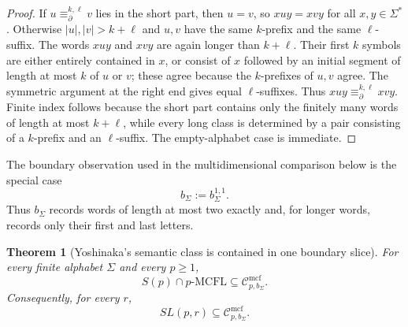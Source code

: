 \documentclass[11pt,a4paper]{article}
\numberwithin{equation}{section}
\theoremstyle{plain}
\newtheorem{theorem}{Theorem}[section]
\theoremstyle{definition}
\theoremstyle{remark}
\newcommand{\Cmcf}[2]{\mathcal{C}^{\mathrm{mcf}}_{#1,#2}}
\begin{document}
\begin{proof}
If $u\equiv_{\partial}^{k,\ell}v$ lies in the short part, then $u=v$, so
$xuy=xvy$ for all $x,y\in\Sigma^*$.  Otherwise $|u|,|v|>k+\ell$ and $u,v$
have the same $k$-prefix and the same $\ell$-suffix.  The words $xuy$ and
$xvy$ are again longer than $k+\ell$.  Their first $k$ symbols are either
entirely contained in $x$, or consist of $x$ followed by an initial segment
of length at most $k$ of $u$ or $v$; these agree because the $k$-prefixes of
$u,v$ agree.  The symmetric argument at the right end gives equal
$\ell$-suffixes.  Thus $xuy\equiv_{\partial}^{k,\ell}xvy$.  Finite index
follows because the short part contains only the finitely many words of
length at most $k+\ell$, while every long class is determined by a pair
consisting of a $k$-prefix and an $\ell$-suffix.  The empty-alphabet case is
immediate.
\end{proof}

The boundary observation used in the multidimensional comparison below is the
special case
\[
  b_\Sigma:=b_\Sigma^{1,1}.
\]
Thus \(b_\Sigma\) records words of length at most two exactly and, for longer
words, records only their first and last letters.


\begin{theorem}[Yoshinaka's semantic class is contained in one boundary slice]
\label{thm:yoshinaka-inclusion}
For every finite alphabet \(\Sigma\) and every \(p\ge1\),
\[
  S(p)\cap p\text{-}\mathrm{MCFL}
  \subseteq
  \Cmcf{p}{b_\Sigma}.
\]
Consequently, for every \(r\),
\[
  SL(p,r)\subseteq\Cmcf{p}{b_\Sigma}.
\]
\end{theorem}
\end{document}

